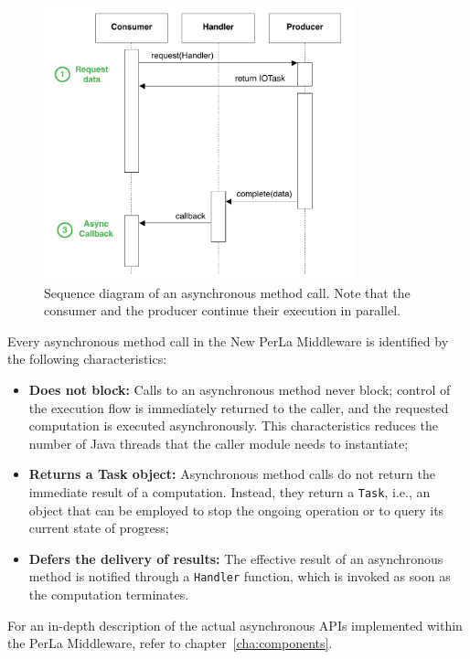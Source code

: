 \begin{figure}[h!]
\center
\includegraphics[width=0.8\textwidth]{imgs/async_paradigm.pdf}
\caption{Sequence diagram of an asynchronous method call. Note that the
consumer and the producer continue their execution in parallel.}
\label{fig:async_paradigm}
\end{figure}

Every asynchronous method call in the New PerLa Middleware is identified by the
following characteristics:

\begin{itemize}

    \item \textbf{Does not block:} Calls to an asynchronous method never block;
        control of the execution flow is immediately returned to the caller,
        and the requested computation is executed asynchronously. This
        characteristics reduces the number of Java threads that the caller
        module needs to instantiate;

    \item \textbf{Returns a Task object:} Asynchronous method calls do not
        return the immediate result of a computation. Instead, they return a
        \texttt{Task}, i.e., an object that can be employed to stop the ongoing
        operation or to query its current state of progress;

    \item \textbf{Defers the delivery of results:} The effective result of an
        asynchronous method is notified through a \texttt{Handler} function,
        which is invoked as soon as the computation terminates.

\end{itemize}

For an in-depth description of the actual asynchronous APIs implemented within
the PerLa Middleware, refer to chapter~\ref{cha:components}.

